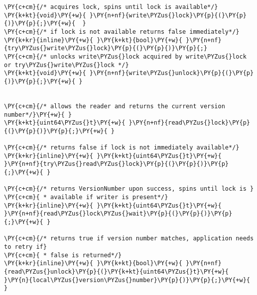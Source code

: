 \begin{Verbatim}[commandchars=\\\{\},codes={\catcode`\$=3\catcode`\^=7\catcode`\_=8\relax}]
\PY{c+cm}{/* acquires lock, spins until lock is available*/}
\PY{k+kt}{void}\PY{+w}{ }\PY{n+nf}{write\PYZus{}lock}\PY{p}{(}\PY{p}{)}\PY{p}{;}\PY{+w}{  }
\PY{c+cm}{/* if lock is not available returns false immediately*/}
\PY{k+kr}{inline}\PY{+w}{ }\PY{k+kt}{bool}\PY{+w}{ }\PY{n+nf}{try\PYZus{}write\PYZus{}lock}\PY{p}{(}\PY{p}{)}\PY{p}{;}
\PY{c+cm}{/* unlocks write\PYZus{}lock acquired by write\PYZus{}lock or try\PYZus{}write\PYZus{}lock */}
\PY{k+kt}{void}\PY{+w}{ }\PY{n+nf}{write\PYZus{}unlock}\PY{p}{(}\PY{p}{)}\PY{p}{;}\PY{+w}{ }


\PY{c+cm}{/* allows the reader and returns the current version number*/}\PY{+w}{ }
\PY{k+kt}{uint64\PYZus{}t}\PY{+w}{ }\PY{n+nf}{read\PYZus{}lock}\PY{p}{(}\PY{p}{)}\PY{p}{;}\PY{+w}{ }

\PY{c+cm}{/* returns false if lock is not immediately available*/}
\PY{k+kr}{inline}\PY{+w}{ }\PY{k+kt}{uint64\PYZus{}t}\PY{+w}{ }\PY{n+nf}{try\PYZus{}read\PYZus{}lock}\PY{p}{(}\PY{p}{)}\PY{p}{;}\PY{+w}{ }

\PY{c+cm}{/* returns VersionNumber upon success, spins until lock is }
\PY{c+cm}{ * available if writer is present*/}
\PY{k+kr}{inline}\PY{+w}{ }\PY{k+kt}{uint64\PYZus{}t}\PY{+w}{ }\PY{n+nf}{read\PYZus{}lock\PYZus{}wait}\PY{p}{(}\PY{p}{)}\PY{p}{;}\PY{+w}{ }

\PY{c+cm}{/* returns true if version number matches, application needs to retry if}
\PY{c+cm}{ * false is returned*/}
\PY{k+kr}{inline}\PY{+w}{ }\PY{k+kt}{bool}\PY{+w}{ }\PY{n+nf}{read\PYZus{}unlock}\PY{p}{(}\PY{k+kt}{uint64\PYZus{}t}\PY{+w}{ }\PY{n}{local\PYZus{}version\PYZus{}number}\PY{p}{)}\PY{p}{;}\PY{+w}{ }
\end{Verbatim}
